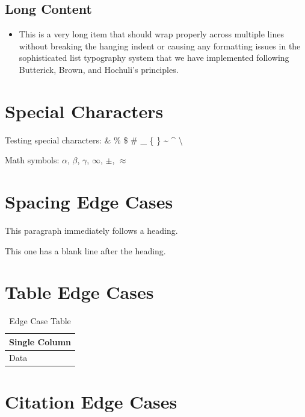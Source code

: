 \documentclass[11pt]{article}
\begin{document}
\subsection{Long Content}
\begin{itemize}
\item This is a very long item that should wrap properly across multiple lines without breaking the hanging indent or causing any formatting issues in the sophisticated list typography system that we have implemented following Butterick, Brown, and Hochuli's principles.
\end{itemize}

\section{Special Characters}

Testing special characters: \& \% \$ \# \_ \{ \} \textasciitilde{} \textasciicircum{} \textbackslash{}

Math symbols: $\alpha$, $\beta$, $\gamma$, $\infty$, $\pm$, $\approx$

\section{Spacing Edge Cases}

This paragraph immediately follows a heading.


This one has a blank line after the heading.

\section{Table Edge Cases}

\begin{table}[h!] %
  \caption{Edge Case Table}
  \centering
  \begin{tabular}{@{}l@{}}
    \toprule
    Single Column \\
    \midrule
    Data \\
    \bottomrule
  \end{tabular}
\end{table}

\section{Citation Edge Cases}
\end{document}
